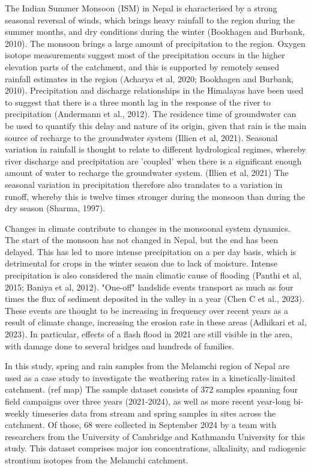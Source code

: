 \bsk

The Indian Summer Monsoon (ISM) in Nepal is characterised by a strong seasonal reversal of winds, which brings heavy rainfall to the region during the summer months, and dry conditions during the winter (Bookhagen and Burbank, 2010). The monsoon brings a large amount of precipitation to the region. Oxygen isotope measurements suggest most of the precipitation occurs in the higher elevation parts of the catchment, and this is supported by remotely sensed rainfall estimates in the region (Acharya et al, 2020; Bookhagen and Burbank, 2010). Precipitation and discharge relationships in the Himalayas have been used to suggest that there is a three month lag in the response of the river to precipitation (Andermann et al., 2012). The residence time of groundwater can be used to quantify this delay and nature of its origin, given that rain is the main source of recharge to the groundwater system (Illien et al, 2021). Seasonal variation in rainfall is thought to relate to different hydrological regimes, whereby river discharge and precipitation are 'coupled' when there is a significant enough amount of water to recharge the groundwater system. (Illien et al, 2021) The seasonal variation in precipitation therefore also translates to a variation in runoff, whereby this is twelve times stronger during the monsoon than during the dry season (Sharma, 1997). 

\bsk

Changes in climate contribute to changes in the monsoonal system dynamics. The start of the monsoon has not changed in Nepal, but the end has been delayed. This has led to more intense precipitation on a per day basis, which is detrimental for crops in the winter season due to lack of moisture. Intense precipitation is also considered the main climatic cause of flooding (Panthi et al, 2015; Baniya et al, 2012). "One-off" landslide events transport as much as four times the flux of sediment deposited in the valley in a year (Chen C et al., 2023). These events are thought to be increasing in frequency over recent years as a result of climate change, increasing the erosion rate in these areas (Adhikari et al, 2023). In particular, effects of a flash flood in 2021 are still visible in the area, with damage done to several bridges and hundreds of families. 

\bsk

In this study, spring and rain samples from the Melamchi region of Nepal are used as a case study to investigate the weathering rates in a kinetically-limited catchment. (ref map) The sample dataset consists of 372 samples spanning four field campaigns over three years (2021-2024), as well as more recent year-long bi-weekly timeseries data from stream and spring samples in sites across the catchment. Of those, 68 were collected in September 2024 by a team with researchers from the University of Cambridge and Kathmandu University for this study. This dataset comprises major ion concentrations, alkalinity, and radiogenic strontium isotopes from the Melamchi catchment. 


